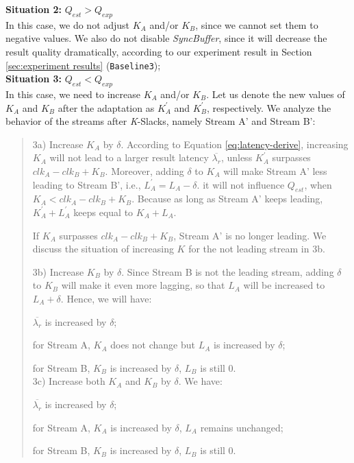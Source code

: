 \documentclass[a4paper, 11pt, twoside]{report}
\newcommand*\circled[1]{\tikz[baseline=(char.base)]{
            \node[shape=circle,draw,inner sep=1.5pt] (char) {#1};}}
\begin{document}
\textbf{Situation 2:} $Q_{est} > Q_{exp}$\\
In this case, we do not adjust $K_A$ and/or $K_B$, since we cannot set them to negative values. We also do not disable \textit{SyncBuffer}, since it will decrease the result quality dramatically, according to our experiment result in Section \ref{sec:experiment results} (\texttt{Baseline3});\\

\textbf{Situation 3:} $Q_{est} < Q_{exp}$\\
In this case, we need to increase $K_A$ and/or $K_B$. Let us denote the new values of $K_A$ and $K_B$ after the adaptation as $K^{\prime}_A$ and $K^{\prime}_B$, respectively. We analyze the behavior of the streams after \textit{K}-Slacks, namely Stream A' and Stream B':

\begin{quote}
3a) Increase $K_A$ by $\delta$. According to Equation \ref{eq:latency-derive}, increasing $K_A$ will not lead to a larger result latency $\overline{\lambda _r}$, unless $K^{\prime}_A$ surpasses $clk_A-clk_B+K_B$. Moreover, adding $\delta$ to $K_A$ will make Stream A' less leading to Stream B', i.e., $L^{\prime}_A=L_A-\delta$. it will not influence $Q_{est}$, when $K_A<clk_A-clk_B+K_B$. Because as long as Stream A' keeps leading, $K^{\prime}_A+L^{\prime}_A$ keeps equal to $K_A+L_A$.

If $K_A$ surpasses $clk_A-clk_B+K_B$, Stream A' is no longer leading. We discuss the situation of increasing $K$ for the not leading stream in 3b.\\

%

3b) Increase $K_B$ by $\delta$. Since Stream B is not the leading stream, adding $\delta$ to $K_B$ will make it even more lagging, so that $L_A$ will be increased to $L_A+\delta$.  Hence, we will have:

\circled{1} $\overline{\lambda _r}$ is increased by $\delta$;

\circled{2} for Stream A, $K_A$ does not change but $L_A$ is increased by $\delta$;

\circled{3} for Stream B, $K_B$ is increased by $\delta$, $L_B$ is still 0.\\

3c) Increase both $K_A$ and $K_B$ by $\delta$. We have:

\circled{1} $\overline{\lambda _r}$ is increased by $\delta$;

\circled{2} for Stream A, $K_A$ is increased by $\delta$, $L_A$ remains unchanged;

\circled{3} for Stream B, $K_B$ is increased by $\delta$, $L_B$ is still 0.

\end{quote}
\end{document}
